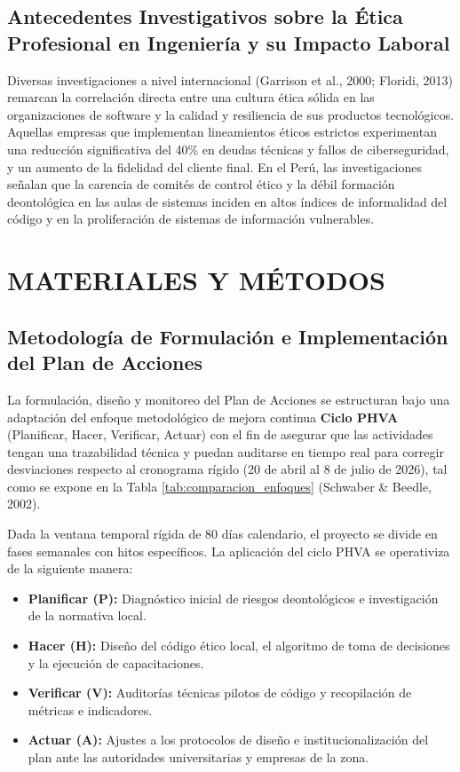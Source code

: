 \documentclass[12pt,a4paper]{article}
\begin{document}
\subsection{Antecedentes Investigativos sobre la Ética Profesional en Ingeniería y su Impacto Laboral}
Diversas investigaciones a nivel internacional (Garrison et al., 2000; Floridi, 2013) remarcan la correlación directa entre una cultura ética sólida en las organizaciones de software y la calidad y resiliencia de sus productos tecnológicos. Aquellas empresas que implementan lineamientos éticos estrictos experimentan una reducción significativa del 40\% en deudas técnicas y fallos de ciberseguridad, y un aumento de la fidelidad del cliente final. En el Perú, las investigaciones señalan que la carencia de comités de control ético y la débil formación deontológica en las aulas de sistemas inciden en altos índices de informalidad del código y en la proliferación de sistemas de información vulnerables.

\newpage

\section{MATERIALES Y MÉTODOS}
\thispagestyle{empty}

\subsection{Metodología de Formulación e Implementación del Plan de Acciones}
La formulación, diseño y monitoreo del Plan de Acciones se estructuran bajo una adaptación del enfoque metodológico de mejora continua \textbf{Ciclo PHVA} (Planificar, Hacer, Verificar, Actuar) con el fin de asegurar que las actividades tengan una trazabilidad técnica y puedan auditarse en tiempo real para corregir desviaciones respecto al cronograma rígido (20 de abril al 8 de julio de 2026), tal como se expone en la Tabla \ref{tab:comparacion_enfoques} (Schwaber \& Beedle, 2002).

Dada la ventana temporal rígida de 80 días calendario, el proyecto se divide en fases semanales con hitos específicos. La aplicación del ciclo PHVA se operativiza de la siguiente manera:
\begin{itemize}
    \item \textbf{Planificar (P):} Diagnóstico inicial de riesgos deontológicos e investigación de la normativa local.
    \item \textbf{Hacer (H):} Diseño del código ético local, el algoritmo de toma de decisiones y la ejecución de capacitaciones.
    \item \textbf{Verificar (V):} Auditorías técnicas pilotos de código y recopilación de métricas e indicadores.
    \item \textbf{Actuar (A):} Ajustes a los protocolos de diseño e institucionalización del plan ante las autoridades universitarias y empresas de la zona.
\end{itemize}
\end{document}
